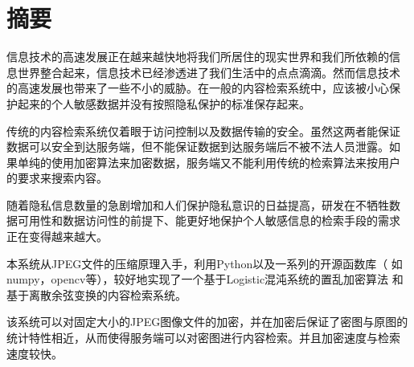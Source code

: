 
\chapter{摘要}
\label{chap:abstract}

信息技术的高速发展正在越来越快地将我们所居住的现实世界和我们所依赖的信
息世界整合起来，信息技术已经渗透进了我们生活中的点点滴滴。然而信息技术
的高速发展也带来了一些不小的威胁。在一般的内容检索系统中，应该被小心保
护起来的个人敏感数据并没有按照隐私保护的标准保存起来。

传统的内容检索系统仅着眼于访问控制以及数据传输的安全。虽然这两者能保证
数据可以安全到达服务端，但不能保证数据到达服务端后不被不法人员泄露。如
果单纯的使用加密算法来加密数据，服务端又不能利用传统的检索算法来按用户
的要求来搜索内容。

随着隐私信息数量的急剧增加和人们保护隐私意识的日益提高，研发在不牺牲数
据可用性和数据访问性的前提下、能更好地保护个人敏感信息的检索手段的需求
正在变得越来越大。

本系统从JPEG文件的压缩原理入手，利用Python以及一系列的开源函数库（
如numpy，opencv等），较好地实现了一个基于Logistic混沌系统的置乱加密算法
和基于离散余弦变换的内容检索系统。

该系统可以对固定大小的JPEG图像文件的加密，并在加密后保证了密图与原图的
统计特性相近，从而使得服务端可以对密图进行内容检索。并且加密速度与检索
速度较快。


